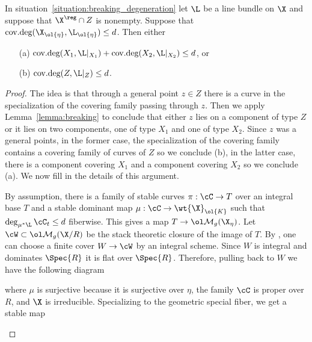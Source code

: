 \documentclass[12pt]{article}
\DeclareMathOperator{\covdeg}{\text{cov.deg}}
\begin{document}
\begin{theorem} \label{thm:deform_and_break_degree}
In situation~\ref{situation:breaking_degeneration} let $\L$ be a line bundle on $\X$ and suppose that $\X^{\reg} \cap Z$ is nonempty.
Suppose that $\covdeg(\X_{\ol{\eta}}, \L_{\ol{\eta}}) \le d$. Then either
\begin{enumerate}
\item[(a)] $\covdeg(X_1, \L|_{X_1}) + \covdeg(X_2, \L|_{X_2}) \le d$, or 
\item[(b)] $\covdeg(Z, \L|_Z) \le d$.
\end{enumerate}
\end{theorem}

\begin{proof}
The idea is that through a general point $z \in Z$ there is a curve in the specialization of the covering family passing through $z$. Then we apply Lemma~\ref{lemma:breaking} to conclude that either $z$ lies on a component of type $Z$ or it lies on two components, one of type $X_1$ and one of type $X_2$. Since $z$ was a general points, in the former case, the specialization of the covering family contains a covering family of curves of $Z$ so we conclude (b), in the latter case, there is a component covering $X_1$ and a component covering $X_2$ so we conclude (a). We now fill in the details of this argument.
\par 
By assumption, there is a family of stable curves $\pi : \cC \to T$ over an integral base $T$ and a stable dominant map $\mu : \cC \to \wt{\X}_{\ol{K}}$ such that $\deg_{\mu^* \L}\cC_t \le d$ fiberwise. This gives a map $T \to \Mbar_{g}(\X_{\eta})$. Let $\cW \subset \Mbar_{g}(\X / R)$ be the stack theoretic closure of the image of $T$. By \cite[Proposition 2.6]{Vis89}, one can choose a finite cover $W \to \cW$ by an integral scheme. 
Since $W$ is integral and dominates $\Spec{R}$ it is flat over $\Spec{R}$. Therefore, pulling back to $W$ we have the following diagram
\begin{center}
\end{center}
where $\mu$ is surjective because it is surjective over $\eta$, the family $\cC$ is proper over $R$, and $\X$ is irreducible. Specializing to the geometric special fiber, we get a stable map
\begin{center}
\begin{tikzcd}

\end{tikzcd}
\end{center}
\end{proof}
\end{document}
